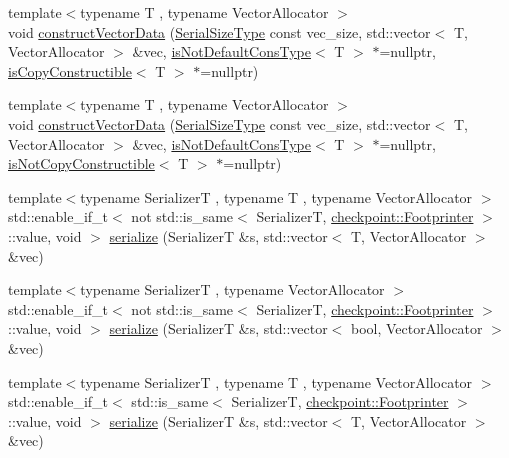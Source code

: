 \begin{DoxyCompactItemize}
\item 
{\footnotesize template$<$typename T , typename Vector\+Allocator $>$ }\\void \hyperlink{namespacecheckpoint_a07ac5236be7239b0aa42aa419f514062}{construct\+Vector\+Data} (\hyperlink{namespacecheckpoint_a083f6674da3f94c2901b18c6d238217c}{Serial\+Size\+Type} const vec\+\_\+size, std\+::vector$<$ T, Vector\+Allocator $>$ \&vec, \hyperlink{namespacecheckpoint_a4032c86e7c92702198dd675a2696ee2c}{is\+Not\+Default\+Cons\+Type}$<$ T $>$ $\ast$=nullptr, \hyperlink{namespacecheckpoint_a60a9850fa59d4b236b2f888baf135a95}{is\+Copy\+Constructible}$<$ T $>$ $\ast$=nullptr)
\item 
{\footnotesize template$<$typename T , typename Vector\+Allocator $>$ }\\void \hyperlink{namespacecheckpoint_ab21ae06103ddad9d211e21ea8c79b69f}{construct\+Vector\+Data} (\hyperlink{namespacecheckpoint_a083f6674da3f94c2901b18c6d238217c}{Serial\+Size\+Type} const vec\+\_\+size, std\+::vector$<$ T, Vector\+Allocator $>$ \&vec, \hyperlink{namespacecheckpoint_a4032c86e7c92702198dd675a2696ee2c}{is\+Not\+Default\+Cons\+Type}$<$ T $>$ $\ast$=nullptr, \hyperlink{namespacecheckpoint_a141a100f9dcca06fb0b6dbf44a5d6756}{is\+Not\+Copy\+Constructible}$<$ T $>$ $\ast$=nullptr)
\item 
{\footnotesize template$<$typename SerializerT , typename T , typename Vector\+Allocator $>$ }\\std\+::enable\+\_\+if\+\_\+t$<$ not std\+::is\+\_\+same$<$ SerializerT, \hyperlink{structcheckpoint_1_1_footprinter}{checkpoint\+::\+Footprinter} $>$\+::value, void $>$ \hyperlink{namespacecheckpoint_ae9a809c203a65d06dbd99acc82be4844}{serialize} (SerializerT \&s, std\+::vector$<$ T, Vector\+Allocator $>$ \&vec)
\item 
{\footnotesize template$<$typename SerializerT , typename Vector\+Allocator $>$ }\\std\+::enable\+\_\+if\+\_\+t$<$ not std\+::is\+\_\+same$<$ SerializerT, \hyperlink{structcheckpoint_1_1_footprinter}{checkpoint\+::\+Footprinter} $>$\+::value, void $>$ \hyperlink{namespacecheckpoint_a4dbdef848c92782b54888f6247f8e8ba}{serialize} (SerializerT \&s, std\+::vector$<$ bool, Vector\+Allocator $>$ \&vec)
\item 
{\footnotesize template$<$typename SerializerT , typename T , typename Vector\+Allocator $>$ }\\std\+::enable\+\_\+if\+\_\+t$<$ std\+::is\+\_\+same$<$ SerializerT, \hyperlink{structcheckpoint_1_1_footprinter}{checkpoint\+::\+Footprinter} $>$\+::value, void $>$ \hyperlink{namespacecheckpoint_a3f43839a02cd77538b0d2f4192e926be}{serialize} (SerializerT \&s, std\+::vector$<$ T, Vector\+Allocator $>$ \&vec)

\end{DoxyCompactItemize}
